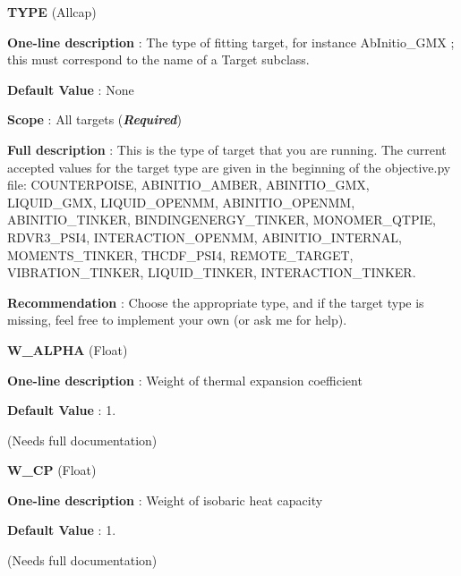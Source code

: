 \begin{DoxyItemize}
\item {\bfseries  T\-Y\-P\-E } (Allcap) \par
{\bfseries  One-\/line description }\-: The type of fitting target, for instance Ab\-Initio\-\_\-\-G\-M\-X ; this must correspond to the name of a Target subclass. \par
{\bfseries  Default Value }\-: None \par
{\bfseries  Scope }\-: All targets ({\bfseries {\itshape Required}}) \par
{\bfseries  Full description }\-: This is the type of target that you are running. The current accepted values for the target type are given in the beginning of the objective.\-py file\-: C\-O\-U\-N\-T\-E\-R\-P\-O\-I\-S\-E, A\-B\-I\-N\-I\-T\-I\-O\-\_\-\-A\-M\-B\-E\-R, A\-B\-I\-N\-I\-T\-I\-O\-\_\-\-G\-M\-X, L\-I\-Q\-U\-I\-D\-\_\-\-G\-M\-X, L\-I\-Q\-U\-I\-D\-\_\-\-O\-P\-E\-N\-M\-M, A\-B\-I\-N\-I\-T\-I\-O\-\_\-\-O\-P\-E\-N\-M\-M, A\-B\-I\-N\-I\-T\-I\-O\-\_\-\-T\-I\-N\-K\-E\-R, B\-I\-N\-D\-I\-N\-G\-E\-N\-E\-R\-G\-Y\-\_\-\-T\-I\-N\-K\-E\-R, M\-O\-N\-O\-M\-E\-R\-\_\-\-Q\-T\-P\-I\-E, R\-D\-V\-R3\-\_\-\-P\-S\-I4, I\-N\-T\-E\-R\-A\-C\-T\-I\-O\-N\-\_\-\-O\-P\-E\-N\-M\-M, A\-B\-I\-N\-I\-T\-I\-O\-\_\-\-I\-N\-T\-E\-R\-N\-A\-L, M\-O\-M\-E\-N\-T\-S\-\_\-\-T\-I\-N\-K\-E\-R, T\-H\-C\-D\-F\-\_\-\-P\-S\-I4, R\-E\-M\-O\-T\-E\-\_\-\-T\-A\-R\-G\-E\-T, V\-I\-B\-R\-A\-T\-I\-O\-N\-\_\-\-T\-I\-N\-K\-E\-R, L\-I\-Q\-U\-I\-D\-\_\-\-T\-I\-N\-K\-E\-R, I\-N\-T\-E\-R\-A\-C\-T\-I\-O\-N\-\_\-\-T\-I\-N\-K\-E\-R. \par
{\bfseries  Recommendation }\-: Choose the appropriate type, and if the target type is missing, feel free to implement your own (or ask me for help).\end{DoxyItemize}
\begin{DoxyItemize}
\item {\bfseries  W\-\_\-\-A\-L\-P\-H\-A } (Float) \par
{\bfseries  One-\/line description }\-: Weight of thermal expansion coefficient \par
{\bfseries  Default Value }\-: 1. \par
(Needs full documentation)\end{DoxyItemize}
\begin{DoxyItemize}
\item {\bfseries  W\-\_\-\-C\-P } (Float) \par
{\bfseries  One-\/line description }\-: Weight of isobaric heat capacity \par
{\bfseries  Default Value }\-: 1. \par
(Needs full documentation)\end{DoxyItemize}
